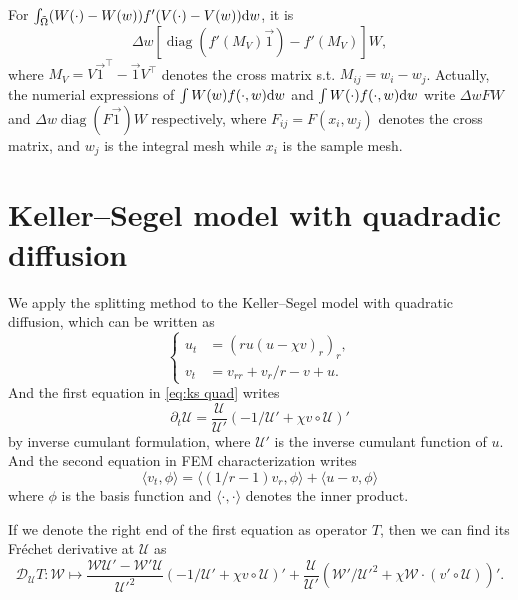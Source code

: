 \documentclass{article}
\newcommand{\frender}{\mathcal D}
\begin{document}
  For $\int_{\tilde\Omega}(W(\cdot) - W(w))f'(V(\cdot) - V(w))\mathrm d w$, it is
  \[
    \Delta w\left[\operatorname{diag}\left(f'(M_V)\vec 1\right) - f'(M_V)\right]W,
  \]
  where $M_V = V\vec 1^\top - \vec 1 V^\top$ denotes the cross matrix s.t. $M_{ij} = w_i - w_j$.
  Actually, the numerial expressions of $\int W(w)f(\cdot, w)\mathrm d w$ and $\int W(\cdot)f(\cdot, w)\mathrm d w$
  write $\Delta w FW$ and $\Delta w\operatorname{diag}(F\vec 1)W$ respectively,
  where $F_{ij} = F(x_i, w_j)$ denotes the cross matrix, and $w_j$ is the integral mesh while $x_i$ is
  the sample mesh.

  \section{Keller--Segel model with quadradic diffusion}
  We apply the splitting method to the Keller--Segel model with quadratic diffusion,
  which can be written as
  \begin{equation}
    \label{eq:ks quad}
    \left\{
      \begin{aligned}
        u_t &= (ru(u - \chi v)_r)_r, \\
        v_t &= v_{rr} + v_r / r - v + u.
      \end{aligned}
    \right.
  \end{equation}
  And the first equation in \cref{eq:ks quad} writes
  \[
    \partial_t\mathcal U = \frac{\mathcal U}{\mathcal U'}
                           (-1 / \mathcal U' + \chi v\circ\mathcal U)'
  \]
  by inverse cumulant formulation, where $\mathcal U'$ is the inverse cumulant
  function of $u$. And the second equation in FEM characterization writes
  \[
    \langle v_t, \phi\rangle
    = \langle (1 / r - 1)v_r, \phi\rangle + \langle u - v, \phi\rangle
  \]
  where $\phi$ is the basis function and $\langle\cdot, \cdot\rangle$ denotes
  the inner product.

  If we denote the right end of the first equation as operator $T$, then
  we can find its Fr\'echet derivative at $\mathcal U$ as
  \[
    \frender_{\mathcal U}T: \mathcal W\mapsto
    \frac{\mathcal W\mathcal U' - \mathcal W'\mathcal U}{\mathcal U'^2}
    (-1 / \mathcal U' + \chi v\circ\mathcal U)'
    +\frac{\mathcal U}{\mathcal U'}
    (\mathcal W' / \mathcal U'^2 + \chi\mathcal W\cdot(v'\circ\mathcal U))'.
  \]
\end{document}
